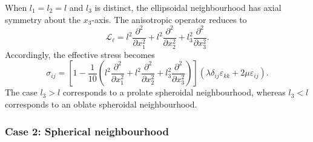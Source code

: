 \documentclass[final,3p,times,fleqn]{elsarticle}
\begin{document}
When $l_1=l_2=l$ and $l_3$ is distinct, the ellipsoidal neighbourhood
has axial symmetry about the $x_3$-axis. The anisotropic operator reduces
to
\begin{equation}\label{eq:spheroidal_operator}
\mathcal{L}_{\ell}
=
l^2\frac{\partial^2}{\partial x_1^2}
+
l^2\frac{\partial^2}{\partial x_2^2}
+
l_3^2\frac{\partial^2}{\partial x_3^2}.
\end{equation}
Accordingly, the effective stress becomes
\begin{equation}\label{eq:spheroidal}
\sigma_{ij}
=
\left[
1
-
\frac{1}{10}
\left(
l^2\frac{\partial^2}{\partial x_1^2}
+
l^2\frac{\partial^2}{\partial x_2^2}
+
l_3^2\frac{\partial^2}{\partial x_3^2}
\right)
\right]
\left(
\lambda\delta_{ij}\varepsilon_{kk}
+
2\mu\varepsilon_{ij}
\right).
\end{equation}
The case $l_3>l$ corresponds to a prolate spheroidal neighbourhood,
whereas $l_3<l$ corresponds to an oblate spheroidal neighbourhood.

\subsubsection*{Case 2: Spherical neighbourhood}
\end{document}
